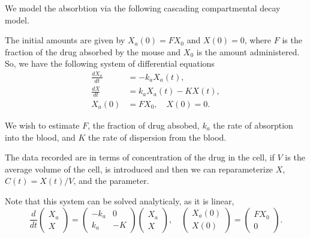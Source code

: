 \documentclass{homework}
\begin{document}
We model the absorbtion via the following cascading compartmental decay model.

\begin{center}
\usetikzlibrary{positioning,fit}
\end{center}

The initial amounts are given by $X_a(0) = F X_0$ and $X(0) = 0$, where $F$ is the fraction of the drug absorbed by the mouse and $X_0$ is the amount administered.  So, we have the following system of differential equations
  \begin{align*}
    \frac{dX_a}{dt} &= -k_a X_a(t),\\
    \frac{dX}{dt}   &= k_a X_a(t) - KX(t),\\
     X_a(0) &= F X_0 , \quad X(0) = 0.
  \end{align*}

We wish to estimate $F$, the fraction of drug absobed, $k_a$ the rate of absorption into the blood, and $K$ the rate of dispersion from the blood.

The data recorded are in terms of concentration of the drug in the cell, if $V$ is the average volume of the cell, is introduced and then we can reparameterize $X$, $C(t) = X(t) / V$, and the parameter. 

Note that this system can be solved analyticaly, as it is linear,
$$
  \frac{d}{dt}
  \begin{pmatrix}
  X_a \\
  X
  \end{pmatrix}
  =
  \begin{pmatrix}
    -k_a & 0 \\
    k_a  & -K
  \end{pmatrix}
  \begin{pmatrix}
  X_a\\
  X
  \end{pmatrix}, \quad \begin{pmatrix} X_a(0) \\ X(0) \end{pmatrix} = \begin{pmatrix} FX_0 \\ 0\end{pmatrix}.
$$ 
\end{document}
